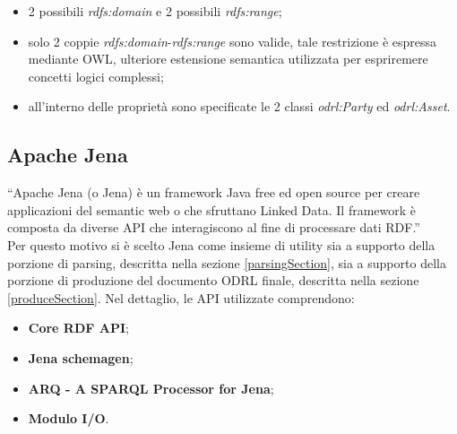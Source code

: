 \documentclass[12pt,a4paper,twoside]{book}
\begin{document}
\begin{itemize}
\item 2 possibili \textit{rdfs:domain} e 2 possibili \textit{rdfs:range};
\item solo 2 coppie \textit{rdfs:domain}-\textit{rdfs:range} sono valide, tale restrizione è espressa mediante OWL\cite{OWL}, ulteriore estensione semantica utilizzata per espriremere concetti logici complessi;
\item all'interno delle proprietà sono specificate le 2 classi \textit{odrl:Party} ed \textit{odrl:Asset}.
\end{itemize}
\subsection{Apache Jena}\label{apacheJenaSec}
``Apache Jena (o Jena) è un framework Java free ed open source per creare applicazioni del semantic web o che sfruttano Linked Data. Il framework è composta da diverse API che interagiscono al fine di processare dati RDF.''\cite{Jena}\\
Per questo motivo si è scelto Jena come insieme di utility sia a supporto della porzione di parsing, descritta nella sezione \ref{parsingSection}, sia a supporto della porzione di produzione del documento ODRL finale, descritta nella sezione \ref{produceSection}. Nel dettaglio, le API utilizzate comprendono:
\begin{itemize}
\item \textbf{Core RDF API};
\item \textbf{Jena schemagen};
\item \textbf{ARQ - A SPARQL Processor for Jena};
\item \textbf{Modulo I/O}.
\end{itemize}
\end{document}
